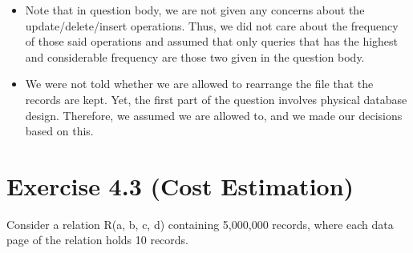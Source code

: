 \documentclass[10pt]{article}
\begin{document}
	\begin{addmargin}[1em]{2em}
		\bigskip
		\begin{itemize}
			\item Note that in question body, we are not given any concerns about the update/delete/insert operations. Thus, we did not care about the frequency of those said operations and assumed that only queries that has the highest and considerable frequency are those two given in the question body.
			
			\item We were not told whether we are allowed to rearrange the file that the records are kept. Yet, the first part of the question involves physical database design. Therefore, we assumed we are allowed to, and we made our decisions based on this.
		\end{itemize}
		
	\end{addmargin}
	
	
	
	
	
	\clearpage
	\section*{Exercise 4.3 (Cost Estimation)}
	
	Consider a relation R(a, b, c, d) containing 5,000,000 records, where each data page of the relation holds 10 records.
	
\end{document}
